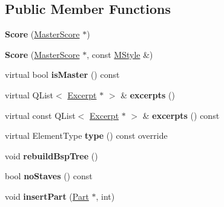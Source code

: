 \subsection*{Public Member Functions}
\begin{DoxyCompactItemize}
\item 
\mbox{\label{class_ms_1_1_score_a2da4e3000773fe1bee12245f8b535922}} 
{\bfseries Score} (\hyperlink{class_ms_1_1_master_score}{Master\+Score} $\ast$)
\item 
\mbox{\label{class_ms_1_1_score_a918d83112a4c5d7d50f7ace1f5f1d674}} 
{\bfseries Score} (\hyperlink{class_ms_1_1_master_score}{Master\+Score} $\ast$, const \hyperlink{class_ms_1_1_m_style}{M\+Style} \&)
\item 
\mbox{\label{class_ms_1_1_score_a8eddd82040d61bffb0d863d6f26270d6}} 
virtual bool {\bfseries is\+Master} () const
\item 
\mbox{\label{class_ms_1_1_score_ab22894e59b8d1694e4d546393daa39d9}} 
virtual Q\+List$<$ \hyperlink{class_ms_1_1_excerpt}{Excerpt} $\ast$ $>$ \& {\bfseries excerpts} ()
\item 
\mbox{\label{class_ms_1_1_score_a7b4c2f75790573148bfa29a810f608da}} 
virtual const Q\+List$<$ \hyperlink{class_ms_1_1_excerpt}{Excerpt} $\ast$ $>$ \& {\bfseries excerpts} () const
\item 
\mbox{\label{class_ms_1_1_score_acff6952d015f5f2928c5c1e0050abc86}} 
virtual Element\+Type {\bfseries type} () const override
\item 
\mbox{\label{class_ms_1_1_score_a42043d12f931f0597ede4c070cafe75a}} 
void {\bfseries rebuild\+Bsp\+Tree} ()
\item 
\mbox{\label{class_ms_1_1_score_a2ead0d028dc0dc6fb610ef07682c6a9c}} 
bool {\bfseries no\+Staves} () const
\item 
\mbox{\label{class_ms_1_1_score_a7b974294ef6436bfd79d9e29054342d7}} 
void {\bfseries insert\+Part} (\hyperlink{class_ms_1_1_part}{Part} $\ast$, int)
\item 

\end{DoxyCompactItemize}
